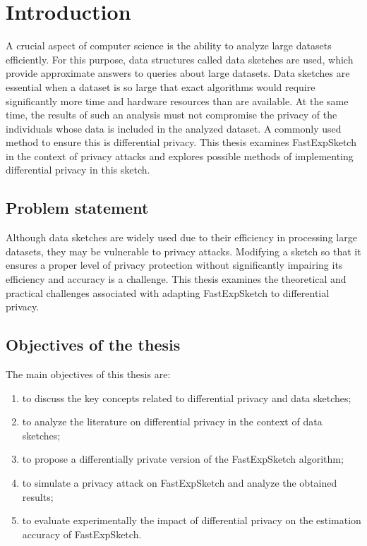 \chapter*{Introduction}

A crucial aspect of computer science is the ability to analyze large datasets efficiently. For this purpose, data structures called data sketches are used, which provide approximate answers to queries about large datasets. Data sketches are essential when a dataset is so large that exact algorithms would require significantly more time and hardware resources than are available. At the same time, the results of such an analysis must not compromise the privacy of the individuals whose data is included in the analyzed dataset. A commonly used method to ensure this is differential privacy. This thesis examines FastExpSketch in the context of privacy attacks and explores possible methods of implementing differential privacy in this sketch.

\section*{Problem statement}

Although data sketches are widely used due to their efficiency in processing large datasets, they may be vulnerable to privacy attacks. Modifying a sketch so that it ensures a proper level of privacy protection without significantly impairing its efficiency and accuracy is a challenge. This thesis examines the theoretical and practical challenges associated with adapting FastExpSketch to differential privacy.

\section*{Objectives of the thesis}

The main objectives of this thesis are:
\begin{enumerate}
  \item to discuss the key concepts related to differential privacy and data sketches;
  \item to analyze the literature on differential privacy in the context of data sketches;
  \item to propose a differentially private version of the FastExpSketch algorithm;
  \item to simulate a privacy attack on FastExpSketch and analyze the obtained results;
  \item to evaluate experimentally the impact of differential privacy on the estimation accuracy of FastExpSketch.
\end{enumerate}

